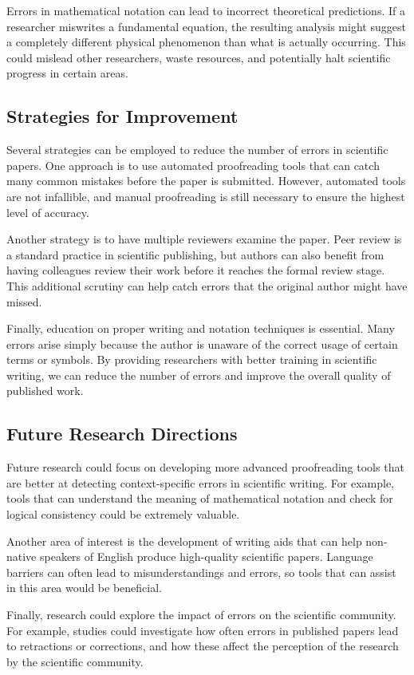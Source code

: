 \documentclass{article}
\begin{document}
Errors in mathematical notation can lead to incorrect theoretical predictions. If a researcher miswrites a fundamental equation, the resulting analysis might suggest a completely different physical phenomenon than what is actually occurring. This could mislead other researchers, waste resources, and potentially halt scientific progress in certain areas.

\subsection{Strategies for Improvement}
Several strategies can be employed to reduce the number of errors in scientific papers. One approach is to use automated proofreading tools that can catch many common mistakes before the paper is submitted. However, automated tools are not infallible, and manual proofreading is still necessary to ensure the highest level of accuracy.

Another strategy is to have multiple reviewers examine the paper. Peer review is a standard practice in scientific publishing, but authors can also benefit from having colleagues review their work before it reaches the formal review stage. This additional scrutiny can help catch errors that the original author might have missed.

Finally, education on proper writing and notation techniques is essential. Many errors arise simply because the author is unaware of the correct usage of certain terms or symbols. By providing researchers with better training in scientific writing, we can reduce the number of errors and improve the overall quality of published work.

\subsection{Future Research Directions}
Future research could focus on developing more advanced proofreading tools that are better at detecting context-specific errors in scientific writing. For example, tools that can understand the meaning of mathematical notation and check for logical consistency could be extremely valuable.

Another area of interest is the development of writing aids that can help non-native speakers of English produce high-quality scientific papers. Language barriers can often lead to misunderstandings and errors, so tools that can assist in this area would be beneficial.

Finally, research could explore the impact of errors on the scientific community. For example, studies could investigate how often errors in published papers lead to retractions or corrections, and how these affect the perception of the research by the scientific community.
\end{document}
